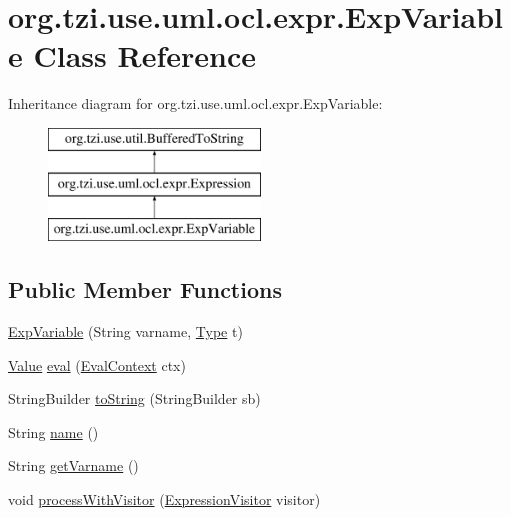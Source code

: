 \hypertarget{classorg_1_1tzi_1_1use_1_1uml_1_1ocl_1_1expr_1_1_exp_variable}{\section{org.\-tzi.\-use.\-uml.\-ocl.\-expr.\-Exp\-Variable Class Reference}
\label{classorg_1_1tzi_1_1use_1_1uml_1_1ocl_1_1expr_1_1_exp_variable}
}
Inheritance diagram for org.\-tzi.\-use.\-uml.\-ocl.\-expr.\-Exp\-Variable\-:\begin{figure}[H]
\begin{center}
\leavevmode
\includegraphics[height=3.000000cm]{classorg_1_1tzi_1_1use_1_1uml_1_1ocl_1_1expr_1_1_exp_variable}
\end{center}
\end{figure}
\subsection*{Public Member Functions}
\begin{DoxyCompactItemize}
\item 
\hyperlink{classorg_1_1tzi_1_1use_1_1uml_1_1ocl_1_1expr_1_1_exp_variable_a1092b0eab0cd46dedefba11820681ef3}{Exp\-Variable} (String varname, \hyperlink{interfaceorg_1_1tzi_1_1use_1_1uml_1_1ocl_1_1type_1_1_type}{Type} t)
\item 
\hyperlink{classorg_1_1tzi_1_1use_1_1uml_1_1ocl_1_1value_1_1_value}{Value} \hyperlink{classorg_1_1tzi_1_1use_1_1uml_1_1ocl_1_1expr_1_1_exp_variable_a35d5df21ac50efe91742c1530660de90}{eval} (\hyperlink{classorg_1_1tzi_1_1use_1_1uml_1_1ocl_1_1expr_1_1_eval_context}{Eval\-Context} ctx)
\item 
String\-Builder \hyperlink{classorg_1_1tzi_1_1use_1_1uml_1_1ocl_1_1expr_1_1_exp_variable_a56316a16f305c34e3e7ec3318600c3fa}{to\-String} (String\-Builder sb)
\item 
String \hyperlink{classorg_1_1tzi_1_1use_1_1uml_1_1ocl_1_1expr_1_1_exp_variable_a964d60ea2607070bc7ac7870e96108f8}{name} ()
\item 
String \hyperlink{classorg_1_1tzi_1_1use_1_1uml_1_1ocl_1_1expr_1_1_exp_variable_a7ea57dd5fcd28824540555483a0cc42f}{get\-Varname} ()
\item 
void \hyperlink{classorg_1_1tzi_1_1use_1_1uml_1_1ocl_1_1expr_1_1_exp_variable_ac1e66fe65f67b8512205f19e3698c1f3}{process\-With\-Visitor} (\hyperlink{interfaceorg_1_1tzi_1_1use_1_1uml_1_1ocl_1_1expr_1_1_expression_visitor}{Expression\-Visitor} visitor)
\end{DoxyCompactItemize}
